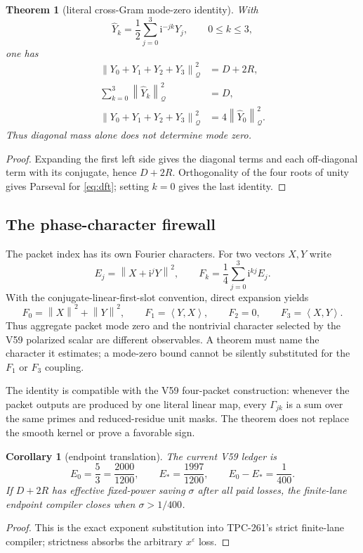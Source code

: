 \documentclass[11pt]{article}
\newtheorem{theorem}{Theorem}
\newtheorem{corollary}{Corollary}
\newcommand{\ip}[2]{\left\langle #1,#2\right\rangle}
\newcommand{\norm}[1]{\left\lVert #1\right\rVert}
\newcommand{\ii}{\mathrm i}
\newcommand{\Qp}{\mathcal Q}
\begin{document}
\begin{theorem}[literal cross-Gram mode-zero identity]
With
\begin{equation}
\widehat Y_k=\frac12\sum_{j=0}^3\ii^{-jk}Y_j,\qquad 0\leq k\leq3,
\label{eq:dft}
\end{equation}
one has
\begin{align}
\norm{Y_0+Y_1+Y_2+Y_3}_{\Qp}^2&=D+2R,\label{eq:modegram}\\
\sum_{k=0}^3\norm{\widehat Y_k}_{\Qp}^2&=D,\label{eq:parseval}\\
\norm{Y_0+Y_1+Y_2+Y_3}_{\Qp}^2
&=4\norm{\widehat Y_0}_{\Qp}^2.\label{eq:modezero}
\end{align}
Thus diagonal mass alone does not determine mode zero.
\end{theorem}
\begin{proof}
Expanding the first left side gives the diagonal terms and each off-diagonal
term with its conjugate, hence \(D+2R\).  Orthogonality of the four roots of
unity gives Parseval for \eqref{eq:dft}; setting \(k=0\) gives the last
identity.
\end{proof}

\subsection{The phase-character firewall}
The packet index has its own Fourier characters.  For two vectors \(X,Y\)
write
\begin{equation}
E_j=\norm{X+\ii^jY}^2,\qquad
F_k=\frac14\sum_{j=0}^3\ii^{kj}E_j.
\label{eq:phase}
\end{equation}
With the conjugate-linear-first-slot convention, direct expansion yields
\begin{equation}
F_0=\norm{X}^2+\norm{Y}^2,\qquad
F_1=\ip{Y}{X},\qquad
F_2=0,\qquad
F_3=\ip{X}{Y}.
\label{eq:phasechars}
\end{equation}
Thus aggregate packet mode zero and the nontrivial character selected by the
V59 polarized scalar are different observables.  A theorem must name the
character it estimates; a mode-zero bound cannot be silently substituted for
the \(F_1\) or \(F_3\) coupling.

The identity is compatible with the V59 four-packet construction: whenever
the packet outputs are produced by one literal linear map, every
\(\Gamma_{jk}\) is a sum over the same primes and reduced-residue unit masks.
The theorem does not replace the smooth kernel or prove a favorable sign.

\begin{corollary}[endpoint translation]
The current V59 ledger is
\begin{equation}
E_0=\frac53=\frac{2000}{1200},\qquad
E_*=\frac{1997}{1200},\qquad E_0-E_*=\frac1{400}.
\label{eq:gap}
\end{equation}
If \(D+2R\) has effective fixed-power saving \(\sigma\) after all paid
losses, the finite-lane endpoint compiler closes when
\(\sigma>1/400\).
\end{corollary}
\begin{proof}
This is the exact exponent substitution into TPC-261's strict finite-lane
compiler; strictness absorbs the arbitrary \(x^\varepsilon\) loss.
\end{proof}
\end{document}
